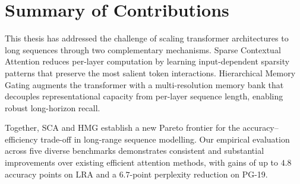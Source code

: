 \section{Summary of Contributions}

This thesis has addressed the challenge of scaling transformer architectures to long
sequences through two complementary mechanisms. Sparse Contextual Attention reduces
per-layer computation by learning input-dependent sparsity patterns that preserve the
most salient token interactions. Hierarchical Memory Gating augments the transformer
with a multi-resolution memory bank that decouples representational capacity from
per-layer sequence length, enabling robust long-horizon recall.

Together, SCA and HMG establish a new Pareto frontier for the accuracy--efficiency
trade-off in long-range sequence modelling. Our empirical evaluation across five diverse
benchmarks demonstrates consistent and substantial improvements over existing efficient
attention methods, with gains of up to $4.8$ accuracy points on LRA and a $6.7$-point
perplexity reduction on PG-19.
